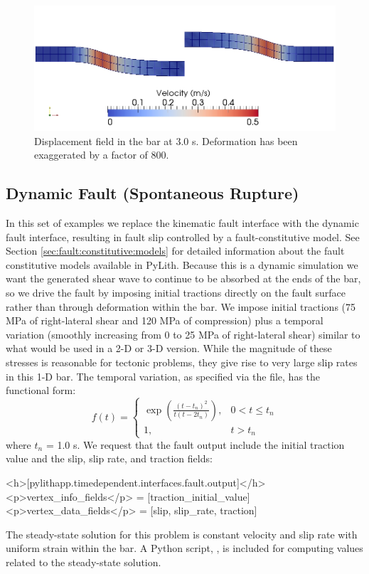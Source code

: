 \begin{figure}
  \includegraphics[scale=0.5]{examples/figs/shearwave_quad4kinematic30}
  \caption{Displacement field in the bar at 3.0 s. Deformation has been exaggerated
    by a factor of 800.}
  \label{fig:shearwave:quad4:kinematic}
\end{figure}


\subsection{Dynamic Fault (Spontaneous Rupture)}

In this set of examples we replace the kinematic fault interface with
the dynamic fault interface, resulting in fault slip controlled by
a fault-constitutive model. See Section \vref{sec:fault:constitutive:models}
for detailed information about the fault constitutive models available
in PyLith. Because this is a dynamic simulation we want the generated
shear wave to continue to be absorbed at the ends of the bar, so we
drive the fault by imposing initial tractions directly on the fault
surface rather than through deformation within the bar. We impose
initial tractions (75 MPa of right-lateral shear and 120 MPa of compression)
plus a temporal variation (smoothly increasing from 0 to 25 MPa of
right-lateral shear) similar to what would be used in a 2-D or 3-D
version. While the magnitude of these stresses is reasonable for tectonic
problems, they give rise to very large slip rates in this 1-D bar.
The temporal variation, as specified via the 
file, has the functional form:
\begin{equation}
f(t)=\begin{cases}
\exp\left(\frac{\left(t-t_{n}\right)^{2}}{t\left(t-2t_{n}\right)}\right), & 0<t\le t_{n}\\
1, & t>t_{n}
\end{cases}
\end{equation}
where $t_{n}$ = 1.0 s. We request that the fault output include the
initial traction value and the slip, slip rate, and traction fields:
\begin{cfg}
<h>[pylithapp.timedependent.interfaces.fault.output]</h>
<p>vertex_info_fields</p> = [traction_initial_value]
<p>vertex_data_fields</p> = [slip, slip_rate, traction]
\end{cfg}
The steady-state solution for this problem is constant velocity and
slip rate with uniform strain within the bar. A Python script,
, is included for computing values
related to the steady-state solution.


